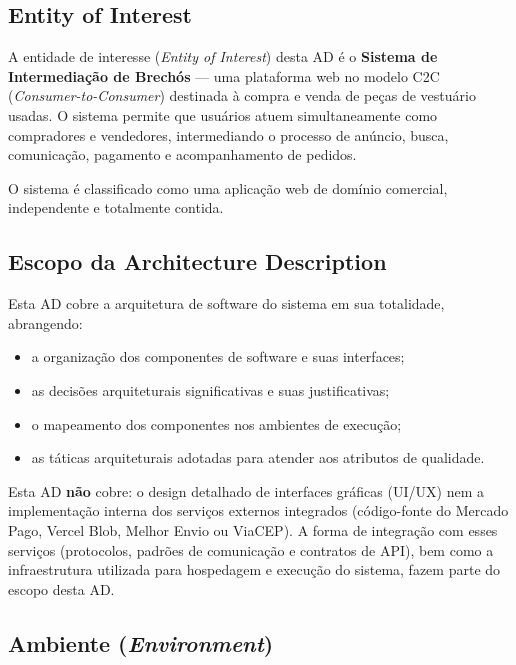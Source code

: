 \documentclass[12pt, a4paper]{article}
\begin{document}
\subsection{Entity of Interest}

A entidade de interesse (\textit{Entity of Interest}) desta AD é o \textbf{Sistema de Intermediação de Brechós} --- uma plataforma web no modelo C2C (\textit{Consumer-to-Consumer}) destinada à compra e venda de peças de vestuário usadas. O sistema permite que usuários atuem simultaneamente como compradores e vendedores, intermediando o processo de anúncio, busca, comunicação, pagamento e acompanhamento de pedidos.

O sistema é classificado como uma aplicação web de domínio comercial, independente e totalmente contida.

\subsection{Escopo da Architecture Description}

Esta AD cobre a arquitetura de software do sistema em sua totalidade, abrangendo:

\begin{itemize}[noitemsep]
    \item a organização dos componentes de software e suas interfaces;
    \item as decisões arquiteturais significativas e suas justificativas;
    \item o mapeamento dos componentes nos ambientes de execução;
    \item as táticas arquiteturais adotadas para atender aos atributos de qualidade.
\end{itemize}

Esta AD \textbf{não} cobre: o design detalhado de interfaces gráficas (UI/UX) nem a implementação interna dos serviços externos integrados (código-fonte do Mercado Pago, Vercel Blob, Melhor Envio ou ViaCEP). A forma de integração com esses serviços (protocolos, padrões de comunicação e contratos de API), bem como a infraestrutura utilizada para hospedagem e execução do sistema, fazem parte do escopo desta AD.

\subsection{Ambiente (\textit{Environment})}
\end{document}
